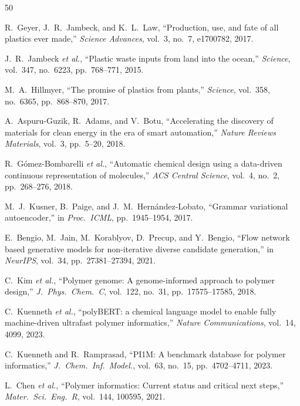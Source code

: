 \documentclass[twocolumn,10pt]{article}
\begin{document}
\begin{thebibliography}{50}

R.~Geyer, J.~R.~Jambeck, and K.~L.~Law, ``Production, use, and fate of all plastics ever made,'' \textit{Science Advances}, vol.~3, no.~7, e1700782, 2017.

J.~R.~Jambeck \textit{et al.}, ``Plastic waste inputs from land into the ocean,'' \textit{Science}, vol.~347, no.~6223, pp.~768--771, 2015.

M.~A.~Hillmyer, ``The promise of plastics from plants,'' \textit{Science}, vol.~358, no.~6365, pp.~868--870, 2017.

A.~Aspuru-Guzik, R.~Adams, and V.~Botu, ``Accelerating the discovery of materials for clean energy in the era of smart automation,'' \textit{Nature Reviews Materials}, vol.~3, pp.~5--20, 2018.

R.~G\'{o}mez-Bombarelli \textit{et al.}, ``Automatic chemical design using a data-driven continuous representation of molecules,'' \textit{ACS Central Science}, vol.~4, no.~2, pp.~268--276, 2018.

M.~J.~Kusner, B.~Paige, and J.~M.~Hern\'{a}ndez-Lobato, ``Grammar variational autoencoder,'' in \textit{Proc.\ ICML}, pp.~1945--1954, 2017.

E.~Bengio, M.~Jain, M.~Korablyov, D.~Precup, and Y.~Bengio, ``Flow network based generative models for non-iterative diverse candidate generation,'' in \textit{NeurIPS}, vol.~34, pp.~27381--27394, 2021.

C.~Kim \textit{et al.}, ``Polymer genome: A genome-informed approach to polymer design,'' \textit{J.\ Phys.\ Chem.\ C}, vol.~122, no.~31, pp.~17575--17585, 2018.

C.~Kuenneth \textit{et al.}, ``polyBERT: a chemical language model to enable fully machine-driven ultrafast polymer informatics,'' \textit{Nature Communications}, vol.~14, 4099, 2023.

C.~Kuenneth and R.~Ramprasad, ``PI1M: A benchmark database for polymer informatics,'' \textit{J.\ Chem.\ Inf.\ Model.}, vol.~63, no.~15, pp.~4702--4711, 2023.

L.~Chen \textit{et al.}, ``Polymer informatics: Current status and critical next steps,'' \textit{Mater.\ Sci.\ Eng.\ R}, vol.~144, 100595, 2021.


\end{thebibliography}
\end{document}
